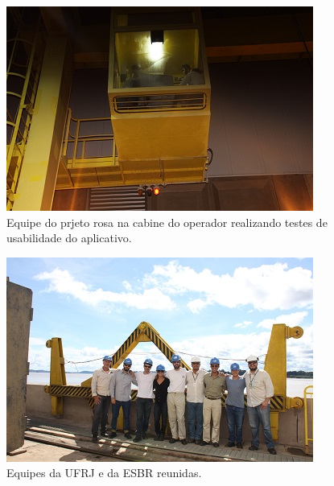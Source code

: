 \begin{figure}[h!]
  \centering
  \includegraphics[width=1\linewidth]{Fotos/Janeiro2015/20.jpg}
  \caption{Equipe do prjeto rosa na cabine do operador realizando testes de usabilidade do aplicativo.}
  \label{nov20134}
\end{figure}

\begin{figure}[h!]
  \centering
  \includegraphics[width=1\linewidth]{Fotos/Janeiro2015/23.jpg}
  \caption{Equipes da UFRJ e da ESBR reunidas.}
  \label{nov20134}
\end{figure}

